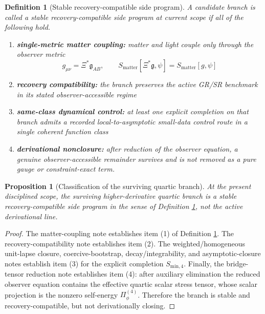 \documentclass[11pt]{article}
\newcommand{\BridgeMetric}{\mathfrak{g}}
\newtheorem{definition}{Definition}
\newtheorem{proposition}{Proposition}
\begin{document}
\begin{definition}[Stable recovery-compatible side program]
\label{def:sideprogram}
A candidate branch is called a \emph{stable recovery-compatible side program} at current scope if all of the following hold.
\begin{enumerate}
    \item \textbf{single-metric matter coupling:} matter and light couple only through the observer metric
    \begin{equation}
    g_{\mu\nu}=\Xi^\ast\BridgeMetric_{AB},
    \qquad
    S_{\mathrm{matter}}[\Xi^\ast\BridgeMetric,\psi]
    =
    S_{\mathrm{matter}}[g,\psi]
    \label{eq:matterroute}
    \end{equation}
    \item \textbf{recovery compatibility:} the branch preserves the active GR/SR benchmark in its stated observer-accessible regime
    \item \textbf{same-class dynamical control:} at least one explicit completion on that branch admits a recorded local-to-asymptotic small-data control route in a single coherent function class
    \item \textbf{derivational nonclosure:} after reduction of the observer equation, a genuine observer-accessible remainder survives and is not removed as a pure gauge or constraint-exact term.
\end{enumerate}
\end{definition}

\begin{proposition}[Classification of the surviving quartic branch]
\label{prop:classification}
At the present disciplined scope, the surviving higher-derivative quartic branch is a stable recovery-compatible side program in the sense of Definition \ref{def:sideprogram}, not the active derivational line.
\end{proposition}

\begin{proof}
The matter-coupling note establishes item (1) of Definition \ref{def:sideprogram}. The recovery-compatibility note establishes item (2). The weighted/homogeneous unit-lapse closure, coercive-bootstrap, decay/integrability, and asymptotic-closure notes establish item (3) for the explicit completion \(S_{\mathrm{min},4}\). Finally, the bridge-tensor reduction note establishes item (4): after auxiliary elimination the reduced observer equation contains the effective quartic scalar stress tensor, whose scalar projection is the nonzero self-energy \(\Pi_\phi^{(4)}\). Therefore the branch is stable and recovery-compatible, but not derivationally closing.
\end{proof}
\end{document}
